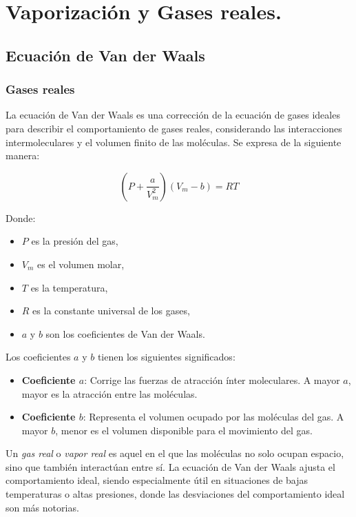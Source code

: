 \documentclass[../main]{subfiles}
\begin{document}
\chapter{Vaporización y Gases reales.}


\section{Ecuación de Van der Waals}

\subsection{Gases reales}


La ecuación de Van der Waals es una corrección de la ecuación de
gases ideales para describir el comportamiento de gases reales,
considerando las interacciones intermoleculares y el volumen finito
de las moléculas. Se expresa de la siguiente manera:

\[
  \left( P + \frac{a}{V_m^2} \right) \left( V_m - b \right) = RT
\]

Donde:
\begin{itemize}
  \item \( P \) es la presión del gas,
  \item \( V_m \) es el volumen molar,
  \item \( T \) es la temperatura,
  \item \( R \) es la constante universal de los gases,
  \item \( a \) y \( b \) son los coeficientes de Van der Waals.
\end{itemize}

Los coeficientes \(a\) y \(b\) tienen los siguientes significados:

\begin{itemize}
  \item \textbf{Coeficiente \( a \)}: Corrige las fuerzas de
    atracción ínter moleculares. A mayor \(a\), mayor es la atracción
    entre las moléculas.
  \item \textbf{Coeficiente \( b \)}: Representa el volumen ocupado
    por las moléculas del gas. A mayor \(b\), menor es el volumen
    disponible para el movimiento del gas.
\end{itemize}

Un \textit{gas real} o \textit{vapor real} es aquel en el que las
moléculas no solo ocupan espacio, sino que también interactúan entre
sí. La ecuación de Van der Waals ajusta el comportamiento ideal,
siendo especialmente útil en situaciones de bajas temperaturas o
altas presiones, donde las desviaciones del comportamiento ideal son
más notorias.
\end{document}

